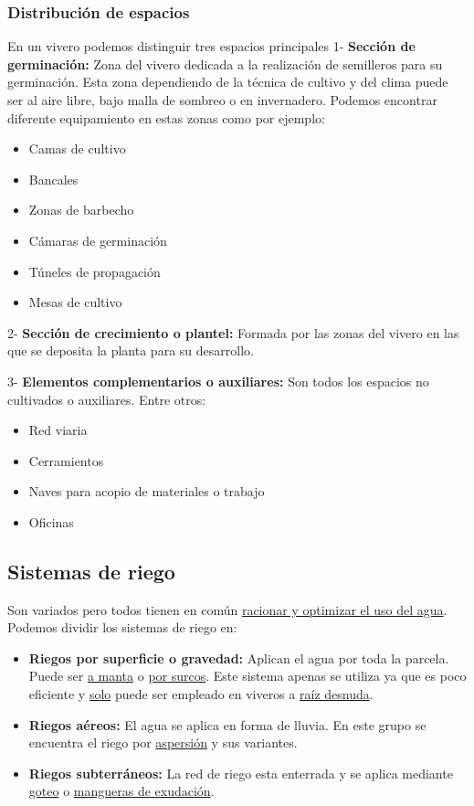 \documentclass[a4paper,12pt,oneside]{article}
\begin{document}
\subsubsection{Distribución de espacios}
\label{sec:org4449bef}
En un vivero podemos distinguir tres espacios principales
1- \textbf{Sección de germinación:}
Zona del vivero dedicada a la realización de semilleros para su
germinación. Esta zona dependiendo de la técnica de cultivo y del clima puede
ser al aire libre, bajo malla de sombreo o en invernadero. 
Podemos encontrar diferente equipamiento en estas zonas como por ejemplo:\\
\begin{itemize}
\item Camas de cultivo
\item Bancales
\item Zonas de barbecho
\item Cámaras de germinación
\item Túneles de propagación
\item Mesas de cultivo\\
\end{itemize}

2- \textbf{Sección de crecimiento o plantel:}
Formada por las zonas del vivero en las que se deposita la planta para su
desarrollo.

3- \textbf{Elementos complementarios o auxiliares:}
Son todos los espacios no cultivados o auxiliares. Entre otros:\\
\begin{itemize}
\item Red viaria
\item Cerramientos
\item Naves para acopio de materiales o trabajo
\item Oficinas
\end{itemize}
\subsection{Sistemas de riego}
\label{sec:orgc2376eb}
Son variados pero todos tienen en común \uline{racionar y optimizar el uso del
agua}. Podemos dividir los sistemas de riego en:\\
\begin{itemize}
\item \textbf{Riegos por superficie o gravedad:} Aplican el agua por toda la parcela. Puede
ser \uline{a manta} o \uline{por surcos}. Este sistema apenas se utiliza ya que es poco
eficiente y \uline{solo} puede ser empleado en viveros a \uline{raíz desnuda}.
\item \textbf{Riegos aéreos:} El agua se aplica en forma de lluvia. En este grupo se
encuentra el riego por \uline{aspersión} y sus variantes.
\item \textbf{Riegos subterráneos:} La red de riego esta enterrada y se aplica mediante
\uline{goteo} o \uline{mangueras de exudación}.
\end{itemize}
\end{document}
